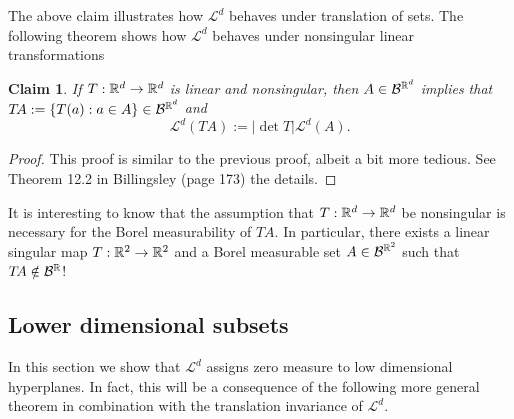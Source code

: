 \documentclass[10pt,letterpaper,twocolumn]{article}
\newtheorem{claim}{Claim}
\begin{document}
The above claim illustrates how $\mathcal L^d$ behaves under translation of sets. The following theorem shows how $\mathcal L^d$ behaves under nonsingular linear transformations
\begin{claim}
If $T:\Bbb R^d\rightarrow \Bbb R^d$ is linear and nonsingular, then $A\in\mathcal B^{\Bbb R^d }$ implies that $T\!A:=\{ T(a): a\in A\}\in \mathcal B^{\Bbb R^d }$ and
\[ \mathcal L^d(T\!A):=|\det T |\mathcal L^d(A). \]
\end{claim}
\begin{proof}
This proof is similar to the previous proof, albeit a bit more tedious. See Theorem 12.2 in Billingsley (page 173) the details.
\end{proof}
It is interesting to know that the assumption that $T:\Bbb R^d\rightarrow \Bbb R^d$ be nonsingular is necessary for the Borel measurability of $T\!A$. In particular, there exists a linear singular map $T:\Bbb R^2\rightarrow \Bbb R^2$ and a Borel measurable set $A\in \mathcal B^{\Bbb R^2}$ such that $T\!A\notin \mathcal B^{\Bbb R}$!

\subsection{Lower dimensional subsets}
In this section we show that $\mathcal L^d$ assigns zero measure to low dimensional hyperplanes. In fact, this will be a consequence of the following more general theorem in combination with the translation invariance of $\mathcal L^d$.
\end{document}
